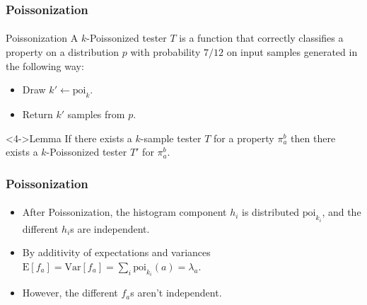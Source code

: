 \documentclass{beamer}
\newcommand{\E}{\mbox{E}} \newcommand{\Cov}{\mbox{Cov}}
\newcommand{\Var}{\mbox{Var}} \newcommand{\Varx}{\mathop{\bf Var\/}}
\begin{document}
\begin{frame}
  \frametitle{Poissonization} \framesubtitle{}

  \begin{block}{Poissonization}
    A $k$-Poissonized tester $T$ is a function that correctly
    classifies a property on a distribution $p$ with probability
    $7/12$ on input samples generated in the following way:
    \begin{itemize}
    \item<2-> Draw $k'\leftarrow \mbox{poi}_k$.
    \item<3-> Return $k'$ samples from $p$.
    \end{itemize}
  \end{block}

  \begin{block}<4->{Lemma}
    If there exists a $k$-sample tester $T$ for a property $\pi_a^b$
    then there exists a $k$-Poissonized tester $T'$ for $\pi_a^b$.
  \end{block}
  
\end{frame}

\begin{frame}
  \frametitle{Poissonization} \framesubtitle{}

  
  \begin{itemize}
  \item<1-> After Poissonization, the histogram component $h_i$ is
    distributed $\mbox{poi}_{k_i}$, and the different $h_i$s are independent.
  \item<2-> By additivity of expectations and variances
    $\E[f_a]=\Var[f_a]=\sum_i\mbox{poi}_{k_i}(a)=\lambda_a$.
  \item<3-> However, the different $f_a$s aren't independent.
 \end{itemize}
  
\end{frame}
\end{document}
